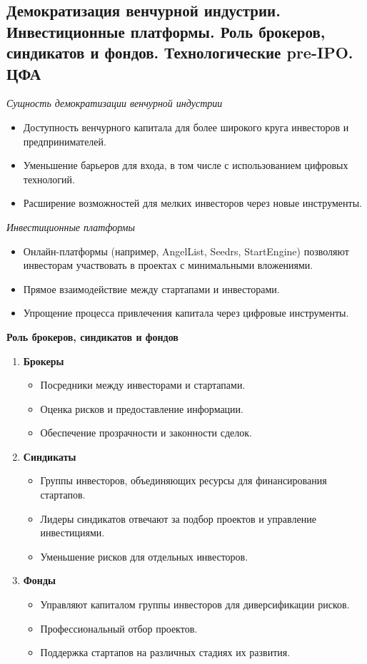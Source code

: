 \pagebreak
\subsection{Демократизация венчурной индустрии. Инвестиционные платформы. Роль брокеров, синдикатов и фондов. Технологические pre-IPO. ЦФА}

\textit{Сущность демократизации венчурной индустрии}
\begin{itemize}
    \item Доступность венчурного капитала для более широкого круга инвесторов и предпринимателей.
    \item Уменьшение барьеров для входа, в том числе с использованием цифровых технологий.
    \item Расширение возможностей для мелких инвесторов через новые инструменты.
\end{itemize}


\textit{Инвестиционные платформы}
\begin{itemize}
    \item Онлайн-платформы (например, AngelList, Seedrs, StartEngine) позволяют инвесторам участвовать в проектах с минимальными вложениями.
    \item Прямое взаимодействие между стартапами и инвесторами.
    \item Упрощение процесса привлечения капитала через цифровые инструменты.
\end{itemize}

\textbf{Роль брокеров, синдикатов и фондов}


\begin{enumerate}
    \item \textbf{Брокеры}
        \begin{itemize}
            \item Посредники между инвесторами и стартапами.
            \item Оценка рисков и предоставление информации.
            \item Обеспечение прозрачности и законности сделок.
        \end{itemize}
    \item \textbf{Синдикаты}
        \begin{itemize}
            \item Группы инвесторов, объединяющих ресурсы для финансирования стартапов.
            \item Лидеры синдикатов отвечают за подбор проектов и управление инвестициями.
            \item Уменьшение рисков для отдельных инвесторов.
        \end{itemize}
    \item \textbf{Фонды}
        \begin{itemize}
            \item Управляют капиталом группы инвесторов для диверсификации рисков.
            \item Профессиональный отбор проектов.
            \item Поддержка стартапов на различных стадиях их развития.
        \end{itemize}
\end{enumerate}


